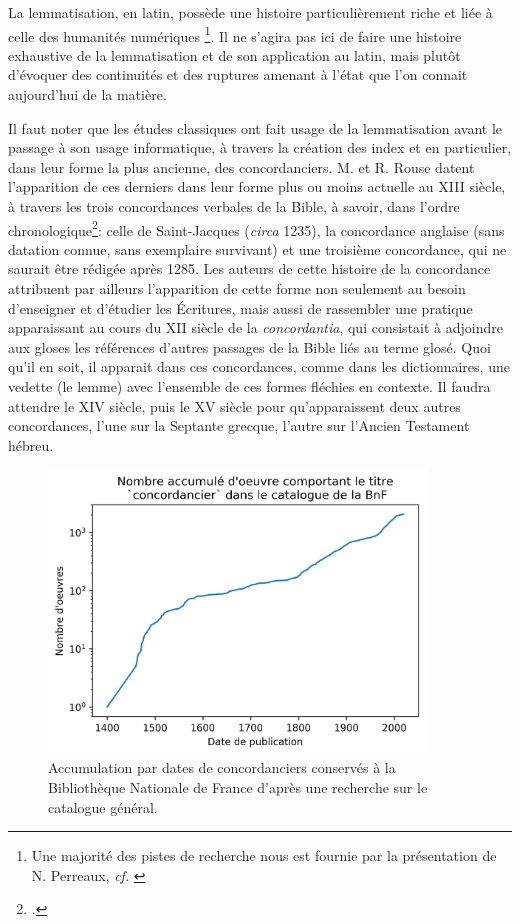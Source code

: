 La lemmatisation, en latin, possède une histoire particulièrement riche et liée à celle des humanités numériques \footnote{Une majorité des pistes de recherche nous est fournie par la présentation de N. Perreaux, \textit{cf.} \cite{perreaux_lemmatisation_2019}}. Il ne s'agira pas ici de faire une histoire exhaustive de la lemmatisation et de son application au latin, mais plutôt d'évoquer des continuités et des ruptures amenant à l'état que l'on connait aujourd'hui de la matière.

Il faut noter que les études classiques ont fait usage de la lemmatisation avant le passage à son usage informatique, à travers la création des index et en particulier, dans leur forme la plus ancienne, des concordanciers. M. et R. Rouse datent l'apparition de ces derniers dans leur forme plus ou moins actuelle au XIII siècle, à travers les trois concordances verbales de la Bible, à savoir, dans l'ordre chronologique\footcite{rouse_concordance_1984}: celle de Saint-Jacques (\textit{circa} 1235), la concordance anglaise (sans datation connue, sans exemplaire survivant) et une troisième concordance, qui ne saurait être rédigée après 1285. Les auteurs de cette histoire de la concordance attribuent par ailleurs l'apparition de cette forme non seulement au besoin d'enseigner et d'étudier les Écritures, mais aussi de rassembler une pratique apparaissant au cours du XII siècle de la \textit{concordantia}, qui consistait à adjoindre aux gloses les références d'autres passages de la Bible liés au terme glosé. Quoi qu'il en soit, il apparait dans ces concordances, comme dans les dictionnaires, une vedette (le lemme) avec l'ensemble de ces formes fléchies en contexte. Il faudra attendre le XIV siècle, puis le XV siècle pour qu'apparaissent deux autres concordances, l'une sur la Septante grecque, l'autre sur l'Ancien Testament hébreu.

\begin{figure}[h]
    \centering
    \includegraphics[width=10cm]{figures/chap3/histoire/concordanciers.png}
    \caption{Accumulation par dates de concordanciers conservés à la Bibliothèque Nationale de France d'après une recherche sur le catalogue général.}
    \label{lemmatisation:concordanciers}
\end{figure}

